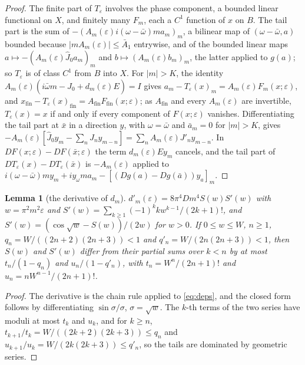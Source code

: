 \documentclass[11pt]{article}
\newtheorem{lemma}{Lemma}[section]
\theoremstyle{definition}
\begin{document}
\begin{proof}
The finite part of $T_\varepsilon$ involves the phase component, a bounded linear functional on $X$, and finitely many $F_m$, each a $C^1$ function of $x$ on $B$. The tail part is the sum of $-(A_m(\varepsilon)i(\omega - \bar\omega)ma_m)_m$, a bilinear map of $(\omega - \bar\omega, a)$ bounded because $|mA_m(\varepsilon)| \le \bar A_1$ entrywise, and of the bounded linear maps $a \mapsto -(A_m(\varepsilon)\hat J_0a_m)_m$ and $b \mapsto (A_m(\varepsilon)b_m)_m$, the latter applied to $g(a)$; so $T_\varepsilon$ is of class $C^1$ from $B$ into $X$. For $|m| > K$, the identity $A_m(\varepsilon)(i\bar\omega m - \hat J_0 + d_m(\varepsilon)E) = I$ gives $a_m - T_\varepsilon(x)_m = A_m(\varepsilon)F_m(x;\varepsilon)$, and $x_{\mathrm{fin}} - T_\varepsilon(x)_{\mathrm{fin}} = A_{\mathrm{fin}}F_{\mathrm{fin}}(x;\varepsilon)$; as $A_{\mathrm{fin}}$ and every $A_m(\varepsilon)$ are invertible, $T_\varepsilon(x) = x$ if and only if every component of $F(x;\varepsilon)$ vanishes. Differentiating the tail part at $\bar x$ in a direction $y$, with $\omega = \bar\omega$ and $\bar a_m = 0$ for $|m| > K$, gives $-A_m(\varepsilon)[\hat J_0y_m - \sum_nJ_ny_{m-n}] = \sum_nA_m(\varepsilon)J'_ny_{m-n}$. In $DF(x;\varepsilon) - DF(\bar x;\varepsilon)$ the term $d_m(\varepsilon)Ey_m$ cancels, and the tail part of $DT_\varepsilon(x) - DT_\varepsilon(\bar x)$ is $-A_m(\varepsilon)$ applied to $i(\omega - \bar\omega)my_m + iy_\omega ma_m - [(Dg(a) - Dg(\bar a))y_a]_m$.
\end{proof}

\begin{lemma}[the derivative of $d_m$]\label{lem:dd}
$d'_m(\varepsilon) = 8\pi^4Dm^4S(w)S'(w)$ with $w = \pi^2m^2\varepsilon$ and $S'(w) = \sum_{k\ge1}(-1)^kkw^{k-1}/(2k+1)!$, and $S'(w) = (\cos\sqrt w - S(w))/(2w)$ for $w > 0$. If $0 \le w \le W$, $n \ge 1$, $q_n = W/((2n+2)(2n+3)) < 1$ and $q'_n = W/(2n(2n+3)) < 1$, then $S(w)$ and $S'(w)$ differ from their partial sums over $k < n$ by at most $t_n/(1 - q_n)$ and $u_n/(1 - q'_n)$, with $t_n = W^n/(2n+1)!$ and $u_n = nW^{n-1}/(2n+1)!$.
\end{lemma}

\begin{proof}
The derivative is the chain rule applied to \eqref{eq:deps}, and the closed form follows by differentiating $\sin\sigma/\sigma$, $\sigma = \sqrt w$. The $k$-th terms of the two series have moduli at most $t_k$ and $u_k$, and for $k \ge n$, $t_{k+1}/t_k = W/((2k+2)(2k+3)) \le q_n$ and $u_{k+1}/u_k = W/(2k(2k+3)) \le q'_n$, so the tails are dominated by geometric series.
\end{proof}
\end{document}

